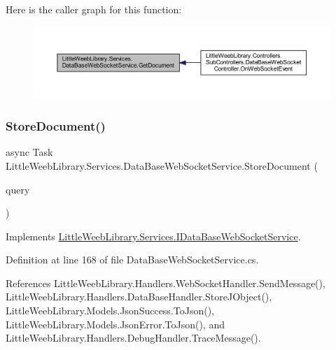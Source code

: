 Here is the caller graph for this function\+:\nopagebreak
\begin{figure}[H]
\begin{center}
\leavevmode
\includegraphics[width=350pt]{class_little_weeb_library_1_1_services_1_1_data_base_web_socket_service_aa51350396b2aa1634a680c94bebdc64c_icgraph}
\end{center}
\end{figure}
\mbox{\label{class_little_weeb_library_1_1_services_1_1_data_base_web_socket_service_af85671a494e85f8418f60606566521f0}} 
\subsubsection{\texorpdfstring{Store\+Document()}{StoreDocument()}}
{\footnotesize\ttfamily async Task Little\+Weeb\+Library.\+Services.\+Data\+Base\+Web\+Socket\+Service.\+Store\+Document (\begin{DoxyParamCaption}\item[{J\+Object}]{query }\end{DoxyParamCaption})}



Implements \mbox{\hyperlink{interface_little_weeb_library_1_1_services_1_1_i_data_base_web_socket_service_a94ab5dc454950814a3e6346e14219a87}{Little\+Weeb\+Library.\+Services.\+I\+Data\+Base\+Web\+Socket\+Service}}.



Definition at line 168 of file Data\+Base\+Web\+Socket\+Service.\+cs.



References Little\+Weeb\+Library.\+Handlers.\+Web\+Socket\+Handler.\+Send\+Message(), Little\+Weeb\+Library.\+Handlers.\+Data\+Base\+Handler.\+Store\+J\+Object(), Little\+Weeb\+Library.\+Models.\+Json\+Success.\+To\+Json(), Little\+Weeb\+Library.\+Models.\+Json\+Error.\+To\+Json(), and Little\+Weeb\+Library.\+Handlers.\+Debug\+Handler.\+Trace\+Message().



